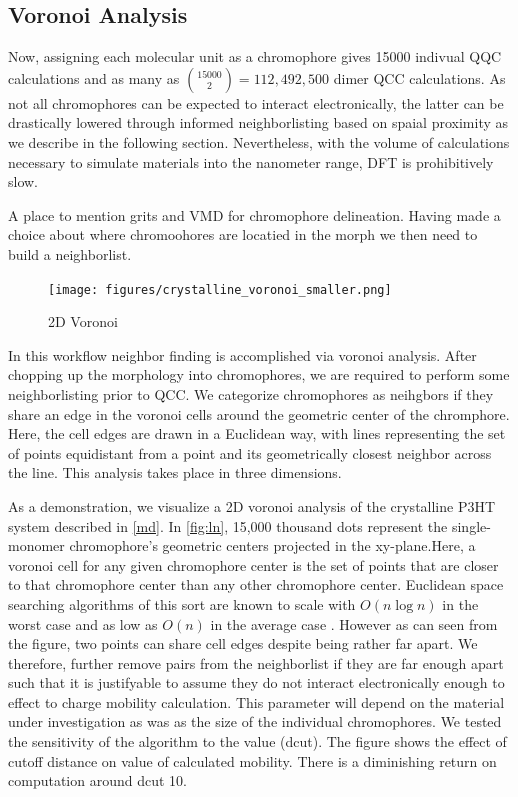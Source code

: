 \subsection{Voronoi Analysis}

Now, assigning each molecular unit as a chromophore
gives 15000 indivual QQC calculations and as many as ${15000 \choose 2} = 112,492,500$
dimer QCC calculations. As not all chromophores can be expected to interact electronically,
the latter can be drastically lowered through informed neighborlisting based on spaial proximity as we describe
in the following section. Nevertheless, with the volume of calculations necessary to simulate materials into the
nanometer range, DFT is prohibitively slow. 


A place to mention grits and VMD for chromophore delineation. Having made a choice about where chromoohores
are locatied in the morph we then need to build a neighborlist. 


\begin{figure}
  \center
  \texttt{[image: figures/crystalline\_voronoi\_smaller.png]} 
  \caption{2D Voronoi}
  \label{fig:2d}
\end{figure}

 In this workflow neighbor finding is accomplished via
voronoi analysis.
After chopping up the morphology into chromophores, we are required to perform some neighborlisting prior to
QCC. We categorize chromophores as
neihgbors if they share an edge in the voronoi cells around the geometric center of the chromphore. Here, the
cell edges are drawn in a Euclidean way, with lines representing the set of points equidistant from a point
and its geometrically closest neighbor across the line. This analysis takes place in three dimensions. 

As a demonstration, we visualize a 2D voronoi analysis of the crystalline 
P3HT system described in \autoref{md}.
In \autoref{fig:ln}, 15,000 thousand dots represent the single-monomer chromophore's geometric centers projected
in the xy-plane.Here,
a voronoi cell for any given chromophore center is the set of points that are closer to that chromophore
center than any other chromophore center. Euclidean space searching algorithms of
this sort are known to scale with $O(n\log{n})$ in the worst case and as low as $O(n)$ in the average case
\cite{Bentley1980}.
However as can seen from the figure, two points can share cell edges despite being rather far apart. We
therefore, further remove pairs from the neighborlist if they are far enough apart such that it is justifyable
to assume they do not interact electronically enough to effect to charge mobility calculation. This parameter will
depend on the material under investigation as was as the size of the individual chromophores. We tested the
sensitivity of the algorithm to the value (dcut). The figure shows the effect of cutoff distance on value of
calculated mobility. There is a diminishing return on computation around dcut 10. 

